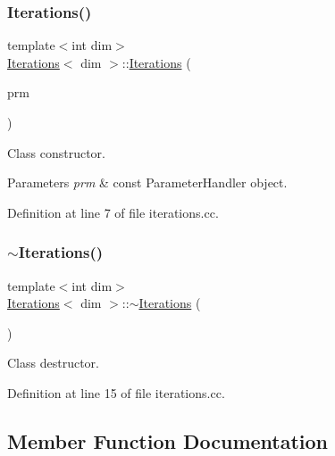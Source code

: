 \subsubsection{\texorpdfstring{Iterations()}{Iterations()}}
{\footnotesize\ttfamily template$<$int dim$>$ \\
\hyperlink{class_iterations}{Iterations}$<$ dim $>$\+::\hyperlink{class_iterations}{Iterations} (\begin{DoxyParamCaption}\item[{const Parameter\+Handler \&}]{prm }\end{DoxyParamCaption})}

Class constructor.


\begin{DoxyParams}{Parameters}
{\em prm} & const Parameter\+Handler object. \\
\hline
\end{DoxyParams}


Definition at line 7 of file iterations.\+cc.

\mbox{\label{class_iterations_ae6ea082615afe8919000b4ea1465f9cf}} 
\subsubsection{\texorpdfstring{$\sim$\+Iterations()}{~Iterations()}}
{\footnotesize\ttfamily template$<$int dim$>$ \\
\hyperlink{class_iterations}{Iterations}$<$ dim $>$\+::$\sim$\hyperlink{class_iterations}{Iterations} (\begin{DoxyParamCaption}{ }\end{DoxyParamCaption})}



Class destructor. 



Definition at line 15 of file iterations.\+cc.



\subsection{Member Function Documentation}
\mbox{\label{class_iterations_ae41347e35b05b6f0fd3cb2a03ab60341}} 
